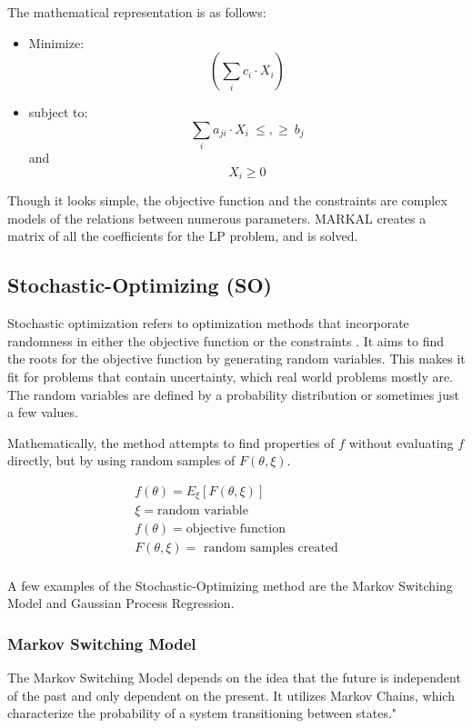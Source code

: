 The mathematical representation is as follows:

\begin{itemize}
	\item[] Minimize:
	\[(\sum_i c_i \cdot X_i) \]
	\item[]subject to:
	\[ \sum_i a_{ji} \cdot X_i \ \leq , \geq \  b_j \] \quad \textrm{and} \quad \[ 	X_i \geq 0 \]
	
\end{itemize}
	
	

Though it looks simple, the objective function and the
constraints are complex models of the relations between
numerous parameters. \gls{MARKAL} creates a matrix
of all the coefficients for the \gls{LP} problem, and is
solved. 


\subsection{Stochastic-Optimizing (SO)}
Stochastic optimization refers to optimization methods
that incorporate randomness in either the objective function
or the constraints \cite{lauren_stochastic_2015}. It aims to find
the roots for the objective function by generating random variables.
This makes it fit for problems that contain uncertainty, which
real world problems mostly are. 
The random variables are defined by a probability distribution
or sometimes just a few values.

Mathematically, the method attempts to find properties of $f$ without
evaluating $f$ directly, but by using random samples of $F(\theta, \xi).$

\begin{align}
	f(\theta)= E_{\xi} [F(\theta, \xi)] \\
	\xi = \mbox{random variable} \\
	f(\theta) = \mbox{objective function} \\
	F(\theta,\xi) = \mbox{ random samples created} \\
\end{align}

A few examples of the Stochastic-Optimizing method are
the Markov Switching Model and Gaussian Process Regression.


\subsubsection{Markov Switching Model}
The Markov Switching Model depends on the idea that
the future is independent of the past and only dependent
on the present. It utilizes Markov Chains, which 
characterize the probability of a system transitioning
between states."

